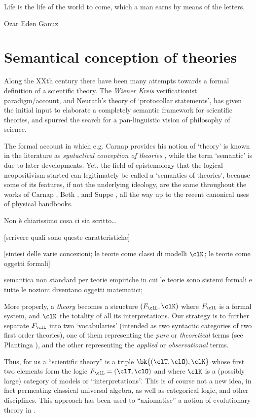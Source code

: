 \epigraph{Life is the life of the world to come, which a man earns by means of the letters.}{Ozar Eden Ganuz}
\section{Semantical conception of theories}
Along the XXth century there have been many attempts towards a formal definition of a scientific theory. The \emph{Wiener Kreis} verificationist paradigm/account, and Neurath's theory of `protocollar statements', has given the initial input to elaborate a completely semantic framework for scientific theories, and spurred the search for a pan-linguistic vision of philosophy of science.

The formal account in which e.g. Carnap \cite{carnap56} provides his notion of `theory' is known in the literature as \emph{syntactical conception of theories} \cite{?}, while the term `semantic' is due to later developments. Yet, the field of epistemology that the logical neopositivism started can legitimately be called a `semantics of theories', because some of its features, if not the underlying ideology, are the same throughout the works of Carnap \cite{carnap56,carnapfound,carnap1956meaning},  Beth \cite{?}, and Suppe \cite{suppe89}, all the way up to the recent canonical uses of physical handbooks.

{\color{red} Non è chiarissimo cosa ci sia scritto\dots}

	[scrivere quali sono queste caratteristiche]

	[sintesi delle varie concezioni; le teorie come classi di modelli $\clK$;
		le teorie come oggetti formali]

semantica non standard per teorie empiriche in cui le teorie sono sistemi formali e tutte le nozioni diventano oggetti matematici; 

More properly, a \emph{theory} becomes a structure $(F_\clL, \clK)$ where $F_\clL$ is a formal system, and $\clK$ the totality of all its interpretations. Our strategy is to further separate $F_\clL$ into two `vocabularies' (intended as two syntactic categories of two first order theories), one of them representing the \emph{pure} or \emph{theoretical} terms (see Plantinga \cite{?}), and the other representing the \emph{applied} or \emph{observational} terms. 

Thus, for us a ``scientific theory'' is a triple $\bk{(\clT,\clO), \clK}$ whose first two elements form the logic $F_\clL=(\clT,\clO)$ and where $\clK$ is a (possibly large) category of models or ``interpretations''. This is of course not a new idea, in fact permeating classical universal algebra, as well as categorical logic, and other disciplines. This approach has been used to ``axiomatise'' a notion of evolutionary theory in \cite{biologia}.


